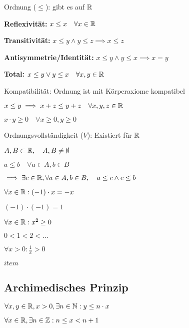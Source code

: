 \begin{compactdesc}
\begin{compactenum}[{D}.1]
        \end{compactenum}
    \item[Ordnung ($\le $):] gibt es auf $\mathbb{R}$
        \begin{compactenum}[{O}.1]
        \item \textbf{Reflexivität:} $x \le x \quad \forall x \in \mathbb{R}$
        \item \textbf{Transitivität:} $x \le y \wedge y \le z \implies x \le z$
        \item \textbf{Antisymmetrie/Identität:} $x \le y \wedge y \le x \implies x = y$
        \item \textbf{Total:} $x \le y \vee y \le x \quad \forall x,y \in \mathbb{R}$
        \end{compactenum}
    \item[Kompatibilität:] Ordnung ist mit Körperaxiome kompatibel
        \begin{compactenum}[{K}.1]
            \item $x \le y \implies x + z \le y + z \quad \forall x,y,z \in \mathbb{R}$
            \item $x \cdot  y \ge 0 \quad \forall x \ge 0, y \ge 0$
        \end{compactenum}
    \item[Ordnungsvollständigkeit ($V$):] Existiert für $\mathbb{R}$
        \begin{compactenum}
            \item $A, B \subset \mathbb{R}, \quad A, B \neq \emptyset$
            \item $a \le  b \quad \forall  a \in  A,b \in B$
        \end{compactenum}
        $\implies \exists c \in  \mathbb{R}, \forall a \in  A, b \in  B, \quad a \le c \wedge c \le b$
\end{compactdesc}

\begin{compactenum}
    \item $\forall x \in \mathbb{R}: (-1) \cdot x = -x$  
    \item $(-1) \cdot  (-1) = 1$
    \item $\forall x \in  \mathbb{R}: x^2 \ge 0$
    \item $0 < 1 < 2 < \ldots$
    \item $\forall x > 0: \frac{1}{x} > 0$
    \item $item$
\end{compactenum}

\subsection{Archimedisches Prinzip}
\begin{compactenum} \item $\forall x,y \in \mathbb{R}, x > 0, \exists n \in \mathbb{N}: y \le n \cdot x$ 
    \item $\forall x \in \mathbb{R}, \exists n \in \mathbb{Z}: n \le x < n + 1$
\end{compactenum}

